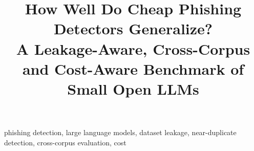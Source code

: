 \documentclass[conference]{IEEEtran}
\begin{document}
\title{How Well Do Cheap Phishing Detectors Generalize?\\
A Leakage-Aware, Cross-Corpus and Cost-Aware Benchmark of Small Open LLMs}

\author{
\and
{}
\and
{}
}

\maketitle

\begin{abstract}

\end{abstract}

\begin{IEEEkeywords}
phishing detection, large language models, dataset leakage, near-duplicate detection, cross-corpus evaluation, cost
\end{IEEEkeywords}











\end{document}
